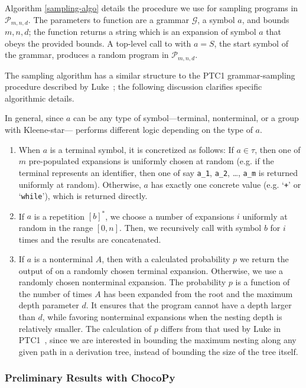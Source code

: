 \documentclass[conference]{IEEEtran}
\begin{document}
Algorithm \ref{sampling-algo} details the procedure we use for sampling programs in $\mathcal{P}_{m,n,d}$. The parameters to function  are a grammar $\mathcal{G}$, a symbol $a$, and bounds $m, n, d$; the function returns a string which is an expansion of symbol $a$ that obeys the provided bounds. A top-level call to  with $a = S$, the start symbol of the grammar, produces a random program in $\mathcal{P}_{m,n,d}$. 

The sampling algorithm has a similar structure to the PTC1 grammar-sampling procedure described by Luke~\cite{Luke00}; the following discussion clarifies specific algorithmic details.

In general, since $a$ can be any type of symbol---terminal, nonterminal, or a group with Kleene-star---  performs different logic depending on the type of $a$. 
\begin{enumerate}
    \item When $a$ is a terminal symbol, it is concretized as follows: If $a \in \tau$, then one of $m$ pre-populated expansions is uniformly chosen at random (e.g. if the terminal represents an identifier, then one of say \texttt{a\_1}, \texttt{a\_2}, \dots, \texttt{a\_m} is returned uniformly at random). Otherwise, $a$ has exactly one concrete value (e.g. `\texttt{+}' or `\texttt{while}'), which is returned directly.
    \item If $a$ is a repetition $[b]^*$, we choose a number of expansions $i$ uniformly at random in the range $[0, n]$. Then, we recursively call  with symbol $b$ for $i$ times and the results are concatenated.
    \item If $a$ is a nonterminal $A$, then with a calculated probability $p$ we return the output of  on a randomly chosen terminal expansion. Otherwise, we use a randomly chosen nonterminal expansion.
The probability $p$ is a function of the number of times $A$ has been expanded from the root and the maximum depth parameter $d$.  It ensures that the program cannot have a depth larger than $d$, while favoring nonterminal expansions when the nesting depth is relatively smaller. The calculation of $p$ differs from that used by Luke in PTC1~\cite{Luke00}, since we are interested in bounding the maximum nesting along any given path in a derivation tree, instead of bounding the size of the tree itself.\end{enumerate}

\subsubsection*{Preliminary Results with ChocoPy} 
\end{document}
